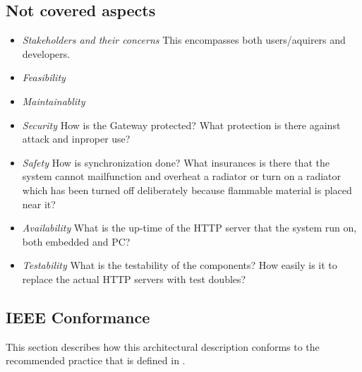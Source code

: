 \documentclass[a4paper,10pt]{article}
\begin{document}
\subsection{Not covered aspects}
\begin{itemize}
\item \emph{Stakeholders and their concerns} This encompasses both users/aquirers and developers.
\item \emph{Feasibility}
\item \emph{Maintainablity}
\item \emph{Security} How is the Gateway protected? What protection is there against attack and inproper use? 
\item \emph{Safety} How is synchronization done? What insurances is there that the system cannot mailfunction and overheat a radiator or turn on a radiator which has been turned off deliberately because flammable material is placed near it?
\item \emph{Availability} What is the up-time of the HTTP server that the system run on, both embedded and PC?
\item \emph{Testability} What is the testability of the components? How easily is it to replace the actual HTTP servers with test doubles?
\end{itemize}

\subsection{IEEE Conformance}


This section describes how this architectural description conforms to the recommended practice
that is defined in \cite{ieeerecommendedpractice}.
\end{document}
